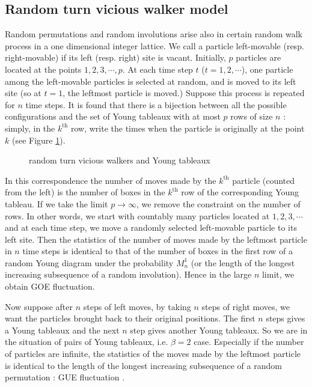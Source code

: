 \subsection{Random turn vicious walker model}

Random permutations and random involutions arise also in certain random 
walk process in a one dimensional integer lattice.
We call a particle left-movable (resp. right-movable) 
if its left (resp. right) site is vacant.
Initially, $p$ particles are located at the points $1,2,3,\cdots,p$.
At each time step $t$ ($t=1,2,\cdots$), 
one particle 
among the left-movable particles 
is selected at random,  
and is moved to its left site
(so at $t=1$, the leftmost particle is moved.)
Suppose this process is repeated for $n$ time steps. 
It is found that \cite{forrester99}
there is a bijection between all the possible configurations 
and the set of Young tableaux with at most $p$ rows of size $n$ : 
simply, in the $k^{\text{th}}$ row, write the times 
when the particle is originally at the point $k$ (see Figure \ref{fig-walk}).
\begin{figure}[ht]
 \centerline{}
 \caption{random turn vicious walkers and Young tableaux}
\label{fig-walk}
\end{figure}
In this correspondence the number of moves made by the $k^{\text{th}}$ 
particle (counted from the left) is the number of boxes 
in the $k^{\text{th}}$ row of the corresponding Young tableau.
If we take the limit $p\to\infty$, we remove the constraint 
on the number of rows. 
In other words, we start with countably many particles located at 
$1,2,3,\cdots$ and at each 
time step, we move a randomly selected left-movable particle 
to its left site.
Then the statistics of the number of moves made by the leftmost particle 
in $n$ time steps 
is identical to that of the number of boxes 
in the first row of a random Young 
diagram under the probability $M^1_n$ (or the length of the longest 
increasing subsequence of a random involution).
Hence in the large $n$ limit, we obtain GOE fluctuation.

Now suppose after $n$ steps of left moves, 
by taking $n$ steps of right moves, 
we want the particles brought back to their original positions.
The first $n$ steps gives a Young tableaux and the next $n$ step gives another 
Young tableaux.
So we are in the situation of pairs of Young tableaux, i.e. $\beta=2$ case.
Especially if the number of particles are infinite, 
the statistics of the moves made by the leftmost 
particle is identical to the length of the longest increasing 
subsequence of a random permutation : GUE fluctuation
\cite{forrester99}.







